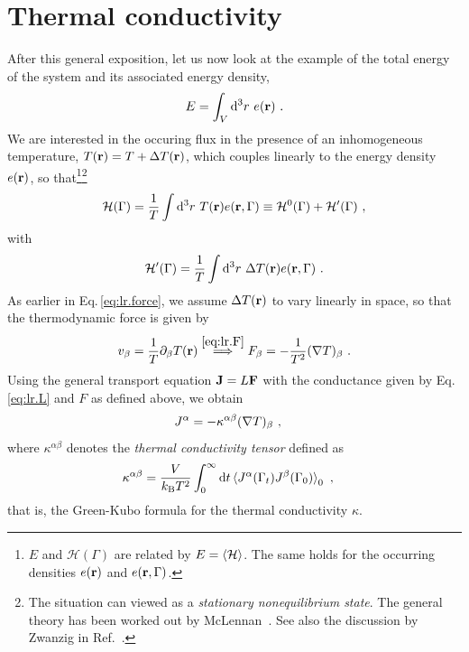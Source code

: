 \section{Thermal conductivity}
\label{sec:Thermal.Conductivity}
After this general exposition, let us now look at the example of the total energy of the system and its associated energy density,
\begin{align}
	E = \int_V \d^3 r ~ e(\b r)~.
	\label{eq:lr.E}
\end{align}
We are interested in the occuring flux in the presence of an inhomogeneous temperature, $T({\bf r}) = T + \Delta T({\bf r})$, which couples linearly to the energy density  $e ({\bf r})$, so that\footnote{$E$ and $\mathcal H(\Gamma)$ are related by $E = \braket{\mathcal H}$. The same holds for the occurring densities $e({\bf r})$ and $e ({\bf r}, \Gamma)$.}\footnote{The situation can viewed as a \emph{stationary nonequilibrium state}. The general theory has been worked out by McLennan~\cite{McLennan1959,McLennan1960}. See also the discussion by Zwanzig in Ref.~\cite{Zwanzig1965}.}
\begin{align}
	\mathcal H (\Gamma) = \frac{1}{T} \int {\rm d}^3 r ~ T ({\bf r}) e({\bf r}, \Gamma) 
		\equiv \mathcal H^0 (\Gamma) + \mathcal H' (\Gamma)~,
\end{align}
with
\begin{align}
	\mathcal H' (\Gamma) = \frac{1}{T} \int \d^3 r ~ \Delta T (\b r) e(\b r, \Gamma)~.
	\label{eq:lr.Hp.temp}
\end{align}
As earlier in Eq.\,\eqref{eq:lr.force}, we assume $\Delta T({\bf r})$ to vary linearly in space, so that the thermodynamic force is given by
\begin{align}
	v_\beta = \frac{1}{T} \partial_\beta T (\b r) 
		\stackrel{\eqref{eq:lr.F}}{\implies}
	F_\beta = - \frac{1}{T^2} (\b \nabla T)_\beta ~.
	\label{eq:lr.F.temp}
\end{align}
Using the general transport equation ${\bf J} = L {\bf F}$ with the conductance given by Eq.\,\eqref{eq:lr.L} and $F$ as defined above, we obtain
\begin{align}
	J^\alpha 
		&= - \kappa^{\alpha \beta} (\b \nabla T)_\beta~,
	\label{eq:lr.J.2}
\end{align}
where $\kappa^{\alpha \beta}$ denotes the \emph{thermal conductivity tensor} defined as
\begin{align}
	\kappa^{\alpha \beta}
		&=
		\frac{V}{k_{\rm B} T^2} \int_{0}^{\infty} 
		\d t \braket{J^\alpha (\Gamma_t) J^\beta (\Gamma_{0})}_0 ~,
	\label{eq:GreenKubo}
\end{align}
that is, the Green-Kubo formula for the thermal conductivity $\kappa$.

